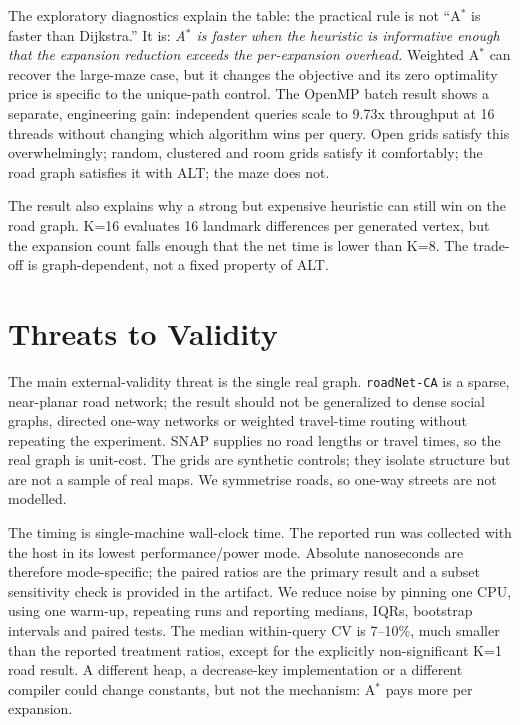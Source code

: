 \documentclass[conference,10pt]{IEEEtran}
\newcommand{\Astar}{A$^\ast$}
\newcommand{\code}[1]{\texttt{#1}}
\begin{document}
The exploratory diagnostics explain the table: the practical rule is not
``\Astar{} is faster than Dijkstra.''  It is: \emph{\Astar{} is faster when
the heuristic is informative enough that the expansion reduction exceeds the
per-expansion overhead.}  Weighted \Astar{} can recover the large-maze case,
but it changes the objective and its zero optimality price is specific to the
unique-path control.  The OpenMP batch result shows a separate, engineering
gain: independent queries scale to 9.73x throughput at 16 threads without
changing which algorithm wins per query.  Open grids satisfy
this overwhelmingly; random, clustered and room grids satisfy it comfortably;
the road graph satisfies it with ALT; the maze does not.

The result also explains why a strong but expensive heuristic can still win on
the road graph.  K=16 evaluates 16 landmark differences per generated vertex,
but the expansion count falls enough that the net time is lower than K=8.  The
trade-off is graph-dependent, not a fixed property of ALT.

\section{Threats to Validity}
\label{sec:threats}

The main external-validity threat is the single real graph.  \code{roadNet-CA}
is a sparse, near-planar road network; the result should not be generalized to
dense social graphs, directed one-way networks or weighted travel-time routing
without repeating the experiment.  SNAP supplies no road lengths or travel
times, so the real graph is unit-cost.  The grids are synthetic controls; they
isolate structure but are not a sample of real maps.  We symmetrise roads, so
one-way streets are not modelled.

The timing is single-machine wall-clock time.  The reported run was collected
with the host in its lowest performance/power mode.  Absolute nanoseconds are
therefore mode-specific; the paired ratios are the primary result and a subset
sensitivity check is provided in the artifact.  We reduce noise by pinning one
CPU, using one warm-up, repeating runs and reporting medians, IQRs, bootstrap
intervals and paired tests.  The median within-query CV is 7--10\%, much smaller
than the reported treatment ratios, except for the explicitly non-significant
K=1 road result.  A different heap, a decrease-key implementation or a
different compiler could change constants, but not the mechanism: \Astar{} pays
more per expansion.
\end{document}
